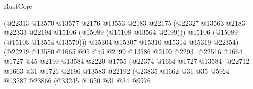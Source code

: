 \begin{lexlean}{RustCore}
\begin{coremodule}
                                (@22313
                                  @13570
                                  @13577
                                  @2176
                                  @13553
                                  @2183
                                  @22175
                                  (@22327
                                    @13563
                                    @2183
                                    @22333
                                    @22194
                                    @15106
                                    (@15089 (@15108 @13564 @2199)))
                                  @15106
                                  (@15089 (@15108 @13554 @13570)))
                                @15304
                                @15307
                                @15310
                                @15314
                                @15319
                                @22354)
                              (@22219
                                @13580
                                @1665
                                @95
                                @45
                                @2199
                                @13586
                                @2199
                                @2293
                                (@22516
                                  @1664
                                  @1727
                                  @45
                                  @2199
                                  @13584
                                  @2220
                                  @1755
                                  (@22374
                                    @1664
                                    @1727
                                    @13584
                                    (@22712
                                      @1663
                                      @31
                                      @1726
                                      @2196
                                      @13583
                                      @22192
                                      (@23835
                                        @1662
                                        @31
                                        @35
                                        @5924
                                        @13582
                                        @23866
                                        (@33245
                                          @1650
                                          @31
                                          @34
                                          @9976

\end{coremodule}
\end{lexlean}
